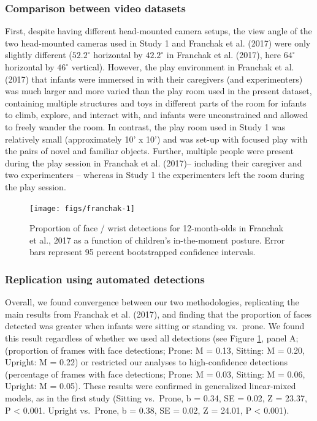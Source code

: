 \documentclass[english,man]{apa6}
\begin{document}
\subsubsection{Comparison between video
datasets}\label{comparison-between-video-datasets}

First, despite having different head-mounted camera setups, the view
angle of the two head-mounted cameras used in Study 1 and Franchak et
al. (2017) were only slightly different (\(52.2^{\circ}\) horizontal by
\(42.2^{\circ}\) in Franchak et al. (2017), here \(64^{\circ}\)
horizontal by \(46^{\circ}\) vertical). However, the play environment in
Franchak et al. (2017) that infants were immersed in with their
caregivers (and experimenters) was much larger and more varied than the
play room used in the present dataset, containing multiple structures
and toys in different parts of the room for infants to climb, explore,
and interact with, and infants were unconstrained and allowed to freely
wander the room. In contrast, the play room used in Study 1 was
relatively small (approximately 10' x 10') and was set-up with focused
play with the pairs of novel and familiar objects. Further, multiple
people were present during the play session in Franchak et al. (2017)--
including their caregiver and two experimenters -- whereas in Study 1
the experimenters left the room during the play session.

\begin{figure}[H]

{\centering \texttt{[image: figs/franchak-1]} 

}

\caption{Proportion of face / wrist detections for 12-month-olds in Franchak et al., 2017 as a function of children's in-the-moment posture. Error bars represent 95 percent bootstrapped confidence intervals.}\label{fig:franchak}
\end{figure}

\subsubsection{Replication using automated
detections}\label{replication-using-automated-detections}

Overall, we found convergence between our two methodologies, replicating
the main results from Franchak et al. (2017), and finding that the
proportion of faces detected was greater when infants were sitting or
standing vs.~prone. We found this result regardless of whether we used
all detections (see Figure \ref{fig:franchak}, panel A; (proportion of
frames with face detections; Prone: M = 0.13, Sitting: M = 0.20,
Upright: M = 0.22) or restricted our analyses to high-confidence
detections (percentage of frames with face detections; Prone: M = 0.03,
Sitting: M = 0.06, Upright: M = 0.05). These results were confirmed in
generalized linear-mixed models, as in the first study (Sitting
vs.~Prone, b = 0.34, SE = 0.02, Z = 23.37, P \textless{} 0.001. Upright
vs.~Prone, b = 0.38, SE = 0.02, Z = 24.01, P \textless{} 0.001).
\end{document}
